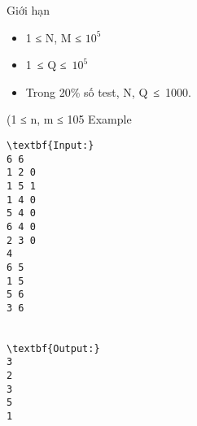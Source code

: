 Giới hạn
\begin{itemize}
	\item     1 ≤ N, M ≤ $10^{5}$
	\item     1 ≤ Q ≤ $10^{5}$
	\item     Trong 20\% số test, N, Q ≤ 1000.   
\end{itemize}     (1 ≤ n, m ≤ 105
Example
\begin{verbatim}
\textbf{Input:}
6 6
1 2 0
1 5 1
1 4 0
5 4 0
6 4 0
2 3 0
4
6 5
1 5
5 6
3 6


\textbf{Output:}
3
2
3
5
1

\end{verbatim}